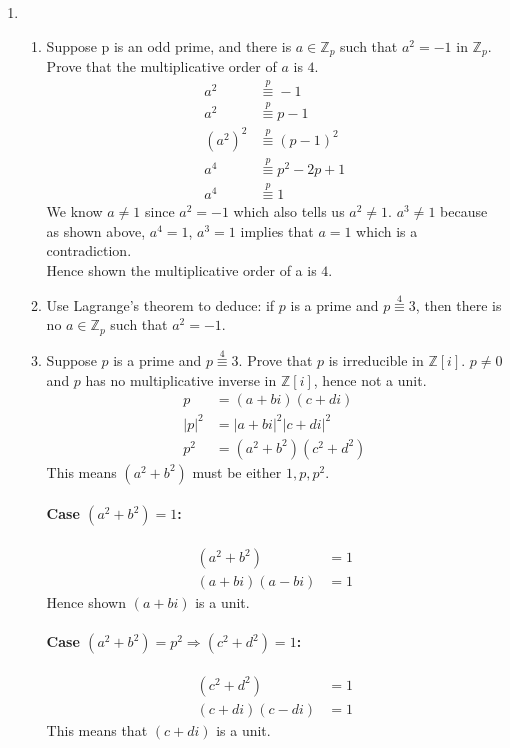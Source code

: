 \documentclass[12pt]{article}
\begin{document}
\begin{enumerate}
	\item 
		\begin{enumerate}
			\item Suppose p is an odd prime, and there is $a\in\mathbb{Z}_p$ such that
				$a^2 = -1$ in $\mathbb{Z}_p$. Prove that the multiplicative order of $a$
				is $4$.
				\begin{align*}
					a^2 &\overset{p}{\equiv} -1\\
					a^2 &\overset{p}{\equiv} p-1\\
					(a^2)^2 &\overset{p}{\equiv} (p-1)^2\\
					a^4 &\overset{p}{\equiv} p^2 -2p +1\\
					a^4 &\overset{p}{\equiv} 1
				\end{align*}
				We know $a\neq 1$ since $a^2 = -1$ which also tells us $a^2 \neq 1$.
				$a^3 \neq 1$ because as shown above, $a^4 = 1$, $a^3 = 1$ implies that
				$a = 1$ which is a contradiction.\\
				Hence shown the multiplicative order of a is $4$.

			\item Use Lagrange's theorem to deduce: if $p$ is a prime and $p
				\overset{4}{\equiv} 3$, then there is no $a\in\mathbb{Z}_p$ such that
				$a^2 = -1$.

			\item Suppose $p$ is a prime and $p \overset{4}{\equiv} 3$. Prove that $p$
				is irreducible in $\mathbb{Z}[i]$. $p \neq 0$ and $p$ has no
				multiplicative inverse in $\mathbb{Z}[i]$, hence not a unit.
				\begin{align*}
					p &= (a+bi)(c+di)\\
					|p|^2 &= |a+bi|^2|c+di|^2\\
					p^2 &= (a^2 + b^2)(c^2 + d^2)
				\end{align*}
				This means $(a^2 + b^2)$ must be either $1, p, p^2$.
				\paragraph{Case $(a^2 + b^2)=1$:}
				\begin{align*}
					(a^2 + b^2)&=1\\
					(a+bi)(a-bi) &= 1
				\end{align*}
				Hence shown $(a+bi)$ is a unit.
				\paragraph{Case $(a^2 + b^2)=p^2 \Rightarrow (c^2 + d^2)=1$:}
				\begin{align*}
					(c^2 + d^2)&=1\\
					(c+di)(c-di) &= 1
				\end{align*}
				This means that $(c+di)$ is a unit.

\end{enumerate}
\end{enumerate}
\end{document}
